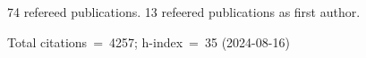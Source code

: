 74 refereed publications. 13 refeered publications as first author.

Total citations~=~4257; h-index~=~35 (2024-08-16)